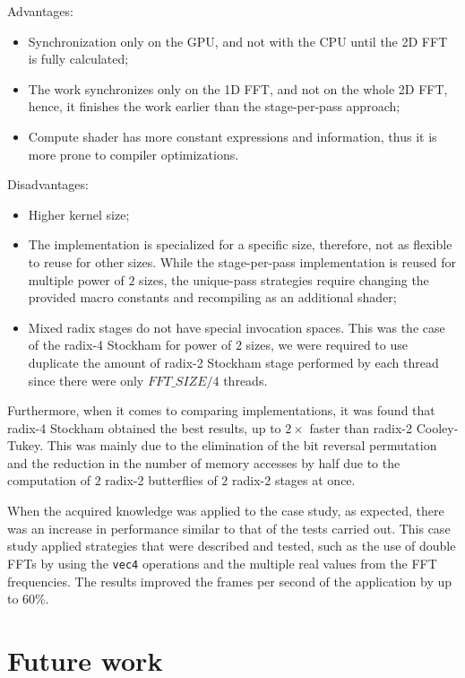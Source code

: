 \documentclass[
  oneside,
  11pt, a4paper,
  footinclude=true,
  headinclude=true,
  cleardoublepage=empty
]{scrbook}
\begin{document}
Advantages:

\begin{itemize}
    \item Synchronization only on the GPU, and not with the CPU until the 2D FFT is fully calculated;
    \item The work synchronizes only on the 1D FFT, and not on the whole 2D FFT, hence, it finishes the work earlier than the stage-per-pass approach;
    \item Compute shader has more constant expressions and information, thus it is more prone to compiler optimizations.
\end{itemize}

Disadvantages:

\begin{itemize}
    \item Higher kernel size;
    \item The implementation is specialized for a specific size, therefore, not as flexible to reuse for other sizes. While the stage-per-pass implementation is reused for multiple power of $2$ sizes, the unique-pass strategies require changing the provided macro constants and recompiling as an additional shader;
    \item Mixed radix stages do not have special invocation spaces. This was the case of the radix-4 Stockham for power of $2$ sizes, we were required to use duplicate the amount of radix-2 Stockham stage performed by each thread since there were only $FFT\_SIZE/4$ threads.
\end{itemize}

Furthermore, when it comes to comparing implementations, it was found that radix-4 Stockham obtained the best results, up to $2 \times$ faster than radix-2 Cooley-Tukey. This was mainly due to the elimination of the bit reversal permutation and the reduction in the number of memory accesses by half due to the computation of $2$ radix-2 butterflies of $2$ radix-2 stages at once.

When the acquired knowledge was applied to the case study, as expected, there was an increase in performance similar to that of the tests carried out. This case study applied strategies that were described and tested, such as the use of double FFTs by using the \texttt{vec4} operations and the multiple real values from the FFT frequencies. The results improved the frames per second of the application by up to 60\%.

\section{Future work}
\end{document}
